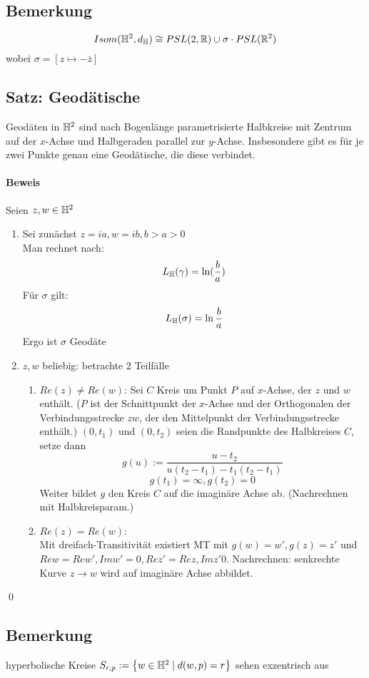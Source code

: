 \documentclass{article}
\begin{document}
\subsection{Bemerkung}
\[Isom(\mathbb{H}^2, d_{\mathbb{H}}) \cong PSL(2,\mathbb{R}) \cup \sigma \cdot PSL(\mathbb{R}^2) \]
wobei $\sigma = [z \mapsto -\overline{z}]$

\subsection{Satz: Geodätische}
Geodäten in $\mathbb{H}^2$ sind nach Bogenlänge parametrisierte Halbkreise mit Zentrum auf der $x$-Achse und Halbgeraden parallel zur $y$-Achse. Insbesondere gibt es für je zwei Punkte genau eine Geodätische, die diese verbindet.

\paragraph{Beweis}
Seien $z,w \in \mathbb{H}^2$
\begin{enumerate}
	\item Sei zunächst $z = ia, w= ib, b > a > 0$\\
	Man rechnet nach:
	\[L_{\mathbb{H}} (\gamma) = \ln(\frac{b}{a}) \]
	Für $\sigma$ gilt:
	\[L_{\mathbb{H}} (\sigma) = \ln\frac{b}{a} \]
	Ergo ist $\sigma$ Geodäte
	\item $z,w$ beliebig: betrachte 2 Teilfälle
	\begin{enumerate}
		\item $Re (z) \neq Re(w)$: Sei $C$ Kreis um Punkt $P$ auf $x$-Achse, der $z$ und $w$ enthält. ($P$ ist der Schnittpunkt der $x$-Achse und der Orthogonalen der Verbindungsstrecke $zw$, der den Mittelpunkt der Verbindungsstrecke enthält.)
		$(0, t_1)$ und $(0,t_2)$ seien die Randpunkte des Halbkreises $C$, setze dann
		\[g(u) := \frac{u - t_2}{u(t_2 - t_1)- t_1(t_2 - t_1)}\]
		\[g(t_1) = \infty, g(t_2) = 0\]
		Weiter bildet $g$ den Kreis $C$ auf die imaginäre Achse ab. (Nachrechnen mit Halbkreisparam.)
		
		\item $Re (z) = Re(w)$:\\
		Mit dreifach-Transitivität existiert MT mit $g(w) = w', g(z) = z'$ und $Re w = Re w', Im w' =0, Re z' = Re z, Im z' 0$. Nachrechnen: senkrechte Kurve $z \rightarrow w$ wird auf imaginäre Achse abbildet.
	\end{enumerate}
\end{enumerate}
\qed

\subsection{Bemerkung}
hyperbolische Kreise $S_{r,p} := \set{w\in \H^2}{d(w,p) = r}$ sehen exzentrisch aus
\end{document}
